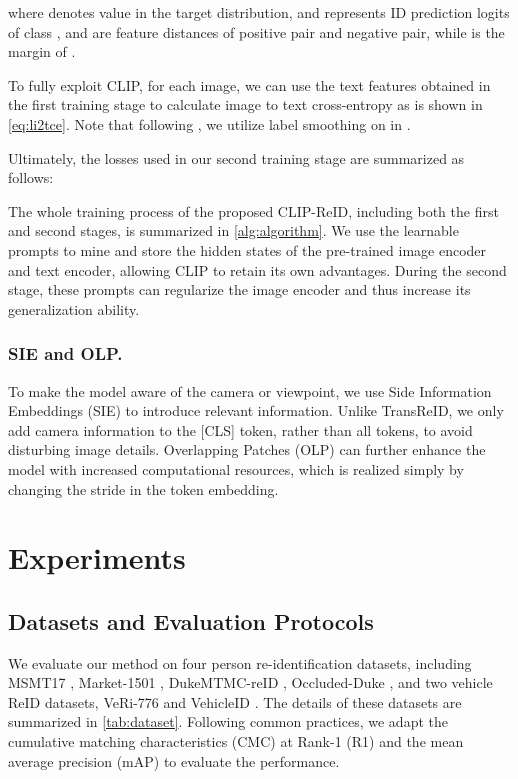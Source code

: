 \documentclass[letterpaper]{article} \usepackage{aaai23}  \usepackage{times}  \usepackage{helvet}  \usepackage{courier}  \usepackage[hyphens]{url}  \usepackage{graphicx} \urlstyle{rm} \def\UrlFont{\rm}  \usepackage{natbib}  \usepackage{caption} \frenchspacing  \setlength{\pdfpagewidth}{8.5in}  \setlength{\pdfpageheight}{11in}  \usepackage{algorithm}
\begin{document}
where  denotes value in the target distribution, and  represents ID prediction logits of class ,  and  are feature distances of positive pair and negative pair, while  is the margin of .

To fully exploit CLIP, for each image, we can use the text features obtained in the first training stage to calculate image to text cross-entropy  as is shown in \cref{eq:li2tce}. Note that following , we utilize label smoothing on  in . 

Ultimately, the losses used in our second training stage are summarized as follows:


The whole training process of the proposed CLIP-ReID, including both the first and second stages, is summarized in \cref{alg:algorithm}. We use the learnable prompts to mine and store the hidden states of the pre-trained image encoder and text encoder, allowing CLIP to retain its own advantages. During the second stage, these prompts can regularize the image encoder and thus increase its generalization ability.

\subsubsection{SIE and OLP.} To make the model aware of the camera or viewpoint, we use Side Information Embeddings (SIE) \cite{transreid} to introduce relevant information. Unlike TransReID, we only add camera information to the [CLS] token, rather than all tokens, to avoid disturbing image details. Overlapping Patches (OLP) can further enhance the model with increased computational resources, which is realized simply by changing the stride in the token embedding.


\section{Experiments}
\subsection{Datasets and Evaluation Protocols}
We evaluate our method on four person re-identification datasets, including MSMT17 \cite{MSMT17}, Market-1501 \cite{market1501}, DukeMTMC-reID \cite{Duke}, Occluded-Duke \cite{Occduke}, and two vehicle ReID datasets, VeRi-776 \cite{VeRi} and VehicleID \cite{VehicleID}. The details of these datasets are summarized in \cref{tab:dataset}. Following common practices, we adapt the cumulative matching characteristics (CMC) at Rank-1 (R1) and the mean average precision (mAP) to evaluate the performance.
\end{document}
